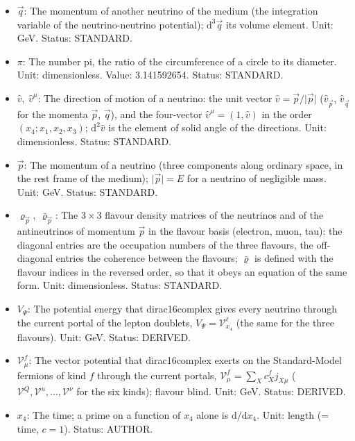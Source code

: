 \documentclass[
  10pt,
]{article}
\begin{document}
\begin{itemize}
  differentials. Status: STANDARD.
\item
  \(\vec q\): The momentum of another neutrino of the medium (the
  integration variable of the neutrino-neutrino potential);
  \(\mathrm{d}^3\vec q\) its volume element. Unit: GeV. Status:
  STANDARD.
\item
  \(\pi\): The number pi, the ratio of the circumference of a circle to
  its diameter. Unit: dimensionless. Value: 3.141592654. Status:
  STANDARD.
\item
  \(\hat v,\ \hat v^\mu\): The direction of motion of a neutrino: the
  unit vector \(\hat v = \vec p/\lvert\vec p\rvert\)
  (\(\hat v_{\vec p}\), \(\hat v_{\vec q}\) for the momenta \(\vec p\),
  \(\vec q\)), and the four-vector \(\hat v^\mu = (1, \hat v)\) in the
  order \((x_4; x_1, x_2, x_3)\); \(\mathrm{d}^2\hat v\) is the element
  of solid angle of the directions. Unit: dimensionless. Status:
  STANDARD.
\item
  \(\vec p\): The momentum of a neutrino (three components along
  ordinary space, in the rest frame of the medium);
  \(\lvert\vec p\rvert = E\) for a neutrino of negligible mass. Unit:
  GeV. Status: STANDARD.
\item
  \(\varrho_{\vec p},\ \bar\varrho_{\vec p}\): The \(3 \times 3\)
  flavour density matrices of the neutrinos and of the antineutrinos of
  momentum \(\vec p\) in the flavour basis (electron, muon, tau): the
  diagonal entries are the occupation numbers of the three flavours, the
  off-diagonal entries the coherence between the flavours;
  \(\bar\varrho\) is defined with the flavour indices in the reversed
  order, so that it obeys an equation of the same form. Unit:
  dimensionless. Status: STANDARD.
\item
  \(V_\Psi\): The potential energy that dirac16complex gives every
  neutrino through the current portal of the lepton doublets,
  \(V_\Psi = \mathcal{V}^{\ell}_{x_4}\) (the same for the three
  flavours). Unit: GeV. Status: DERIVED.
\item
  \(\mathcal{V}^{f}_\mu\): The vector potential that dirac16complex
  exerts on the Standard-Model fermions of kind \(f\) through the
  current portals, \(\mathcal{V}^{f}_\mu = \sum_Xc^{f}_Xj_{X\mu}\)
  (\(\mathcal{V}^{Q}, \mathcal{V}^{u}, \dots, \mathcal{V}^{\nu}\) for
  the six kinds); flavour blind. Unit: GeV. Status: DERIVED.
\item
  \(x_4\): The time; a prime on a function of \(x_4\) alone is
  \(\mathrm{d}/\mathrm{d}x_4\). Unit: length (= time, \(c = 1\)).
  Status: AUTHOR.

\end{itemize}
\end{document}

